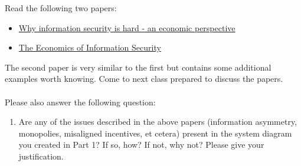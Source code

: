 \documentclass[11pt]{article}
\begin{document}
Read the following two papers:
\begin{itemize}
    \item \href{https://ieeexplore.ieee.org/abstract/document/991552}{Why information security is hard - an economic perspective}
    \item \href{https://www.science.org/doi/full/10.1126/science.1130992}{The Economics of Information Security}
\end{itemize}

The second paper is very similar to the first but contains some additional examples worth knowing.
Come to next class prepared to discuss the papers.
\\ \\
Please also answer the following question:

\begin{enumerate}
    \item Are any of the issues described in the above papers (information asymmetry, monopolies, misaligned incentives, et cetera) present in the system diagram you created in Part 1? If so, how? If not, why not? Please give your justification.
\end{enumerate}






\end{document}
